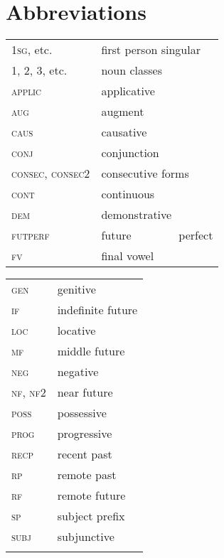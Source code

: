 \documentclass[output=paper]{langsci/langscibook}
\begin{document}
\section*{Abbreviations}
\begin{tabularx}{.45\textwidth}{lX}
\textsc{1sg}, etc. &  first person singular \\

1, 2, 3, etc. & noun classes \\

\textsc{applic} & applicative \\

\textsc{aug}  &  augment\\

\textsc{caus} &   causative \\

\textsc{conj}   &  conjunction \\

\textsc{consec, consec2} &  consecutive forms \\

\textsc{cont}  &  continuous \\

\textsc{dem}  &  demonstrative \\

\textsc{futperf} & future {\ \ \ \ \ \ \ } perfect \\

\textsc{fv}  &  final vowel \\
\end{tabularx}
\begin{tabularx}{.45\textwidth}{lX}
\textsc{gen}  &  genitive \\

\textsc{if}  &  indefinite future \\

\textsc{loc}  &  locative \\

\textsc{mf} &   middle future \\

\textsc{neg}  &  negative \\

\textsc{nf, nf2} & near future \\

\textsc{poss}  &  possessive \\

\textsc{prog}  &  progressive \\

\textsc{recp}  &  recent past \\

\textsc{rp}  &  remote past \\

\textsc{rf}  &  remote future \\

\textsc{sp}  &  subject prefix \\

\textsc{subj}   & subjunctive \\
& \\
\end{tabularx}
\end{document}
